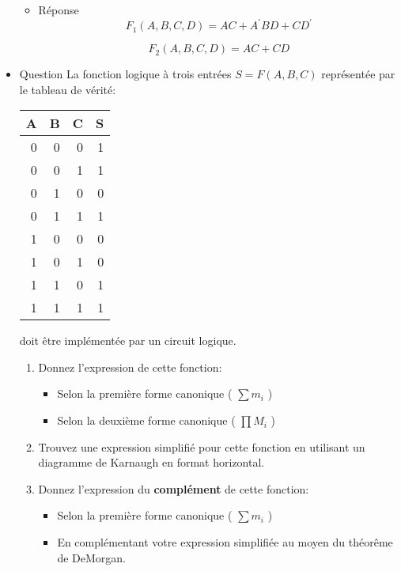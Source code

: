 \documentclass[letter, oneside]{book}
\begin{document}
\begin{itemize}
\begin{itemize}
\item Réponse
\label{sec:org60a67bc}
$$
F_1(A,B,C,D)
= A C + A^{\prime} B D + C D^{\prime} 
$$

$$
F_2(A,B,C,D)
= A C + C D
$$
\end{itemize}

\item Question
\label{sec:org3a3bbe5}
La fonction logique à trois entrées \(S = F(A,B,C)\) représentée par
le tableau de vérité:

\begin{center}
\begin{tabular}{rrrr}
A & B & C & S\\[0pt]
\hline
0 & 0 & 0 & 1\\[0pt]
0 & 0 & 1 & 1\\[0pt]
0 & 1 & 0 & 0\\[0pt]
0 & 1 & 1 & 1\\[0pt]
1 & 0 & 0 & 0\\[0pt]
1 & 0 & 1 & 0\\[0pt]
1 & 1 & 0 & 1\\[0pt]
1 & 1 & 1 & 1\\[0pt]
\end{tabular}
\end{center}
doit être implémentée par un circuit logique.

\begin{enumerate}
\item Donnez l'expression de cette fonction:

\begin{itemize}
\item Selon la première forme canonique ( \(\sum m_i\) )

\item Selon la deuxième forme canonique ( \(\prod M_i\) )
\end{itemize}

\item Trouvez une expression simplifié pour cette fonction en utilisant
un diagramme de Karnaugh en format horizontal.

\item Donnez l'expression du \textbf{complément} de cette fonction:

\begin{itemize}
\item Selon la première forme canonique ( \(\sum m_i\) )

\item En complémentant votre expression simplifiée au moyen du
théorême de DeMorgan.
\end{itemize}


\end{enumerate}
\end{itemize}
\end{document}
